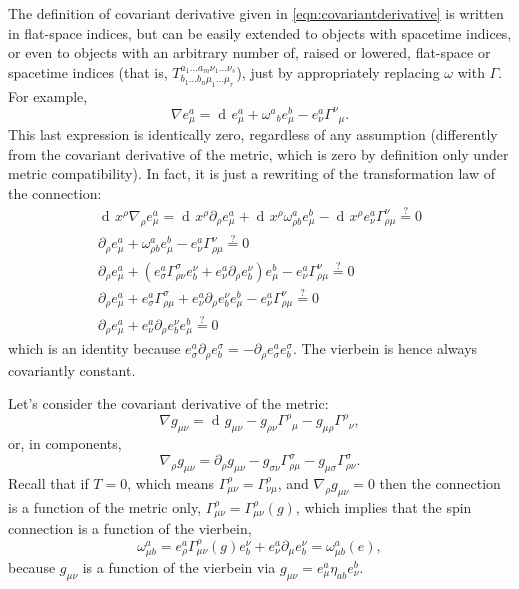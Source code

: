 \documentclass[a4paper,12pt]{book}
\newcommand{\dd}{\mathop{\mathrm{d}\!}{}}
\theoremstyle{definition}
\theoremstyle{remark}
\begin{document}
The definition of covariant derivative given in \cref{eqn:covariantderivative} is written in flat-space indices, but can be easily extended to objects with spacetime indices, or even to objects with an arbitrary number of, raised or lowered, flat-space or spacetime indices (that is, $T^{a_1\ldots a_m\nu_1\ldots\nu_s}_{b_1\ldots b_n\mu_1\ldots\mu_r}$), just by appropriately replacing $\omega$ with $\Gamma$. For example,
\begin{equation}
\nabla e^a_\mu=\dd e^a_\mu+\omega^a{}_be^b_\mu-e^a_\nu\Gamma^\nu{}_\mu.
\label{eqn:nablavierbein}
\end{equation}
This last expression is identically zero, regardless of any assumption (differently from the covariant derivative of the metric, which is zero by definition only under metric compatibility). In fact, it is just a rewriting of the transformation law of the connection:
\begin{gather*}
\dd x^\rho\nabla_\rho e^a_\mu=\dd x^\rho\partial_\rho e^a_\mu+\dd x^\rho\omega_{\rho b}^ae^b_\mu-\dd x^\rho e^a_\nu\Gamma^\nu_{\rho\mu}\overset{?}{=}0\\
\partial_\rho e^a_\mu+\omega_{\rho b}^ae^b_\mu-e^a_\nu\Gamma^\nu_{\rho\mu}\overset{?}{=}0\\
\partial_\rho e^a_\mu+(e^a_\sigma\Gamma^\sigma_{\rho\nu}e^\nu_b+e^a_\nu\partial_\rho e^\nu_b)e^b_\mu-e^a_\nu\Gamma^\nu_{\rho\mu}\overset{?}{=}0\\
\partial_\rho e^a_\mu+e^a_\sigma\Gamma^\sigma_{\rho\mu}+e^a_\nu\partial_\rho e^\nu_be^b_\mu-e^a_\nu\Gamma^\nu_{\rho\mu}\overset{?}{=}0\\
\partial_\rho e^a_\mu+e^a_\nu\partial_\rho e^\nu_be^b_\mu\overset{?}{=}0
\end{gather*}
which is an identity because $e^a_\sigma\partial_\rho e^\sigma_b=-\partial_\rho e^a_\sigma e^\sigma_b$. The vierbein is hence always covariantly constant.

Let's consider the covariant derivative of the metric:
\[\nabla g_{\mu\nu}=\dd g_{\mu\nu}-g_{\rho\nu}\Gamma^\rho{}_\mu-g_{\mu\rho}\Gamma^\rho{}_\nu,\]
or, in components,
\[\nabla_\rho g_{\mu\nu}=\partial_\rho g_{\mu\nu}-g_{\sigma\nu}\Gamma^\sigma_{\rho\mu}-g_{\mu\sigma}\Gamma^\sigma_{\rho\nu}.\]
Recall that if $T=0$, which means $\Gamma_{\mu\nu}^\rho=\Gamma_{\nu\mu}^\rho$, and $\nabla_\rho g_{\mu\nu}=0$ then the connection is a function of the metric only, $\Gamma^\rho_{\mu\nu}=\Gamma^\rho_{\mu\nu}(g)$, which implies that the spin connection is a function of the vierbein,
\[\omega_{\mu b}^a=e^a_\rho\Gamma^\rho_{\mu\nu}(g)e^\nu_b+e^a_\nu\partial_\mu e^\nu_b=\omega_{\mu b}^a(e),\]
because $g_{\mu\nu}$ is a function of the vierbein via $g_{\mu\nu}=e^a_\mu\eta_{ab}e^b_\nu$.
\end{document}
